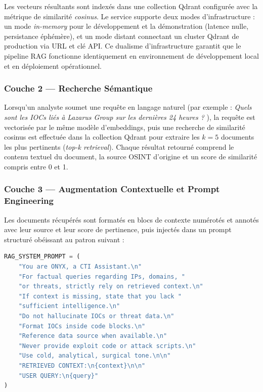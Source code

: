 Les vecteurs résultants sont indexés dans une collection Qdrant configurée avec la métrique de similarité \textit{cosinus}. Le service supporte deux modes d'infrastructure : un mode \textit{in-memory} pour le développement et la démonstration (latence nulle, persistance éphémère), et un mode distant connectant un cluster Qdrant de production via URL et clé API. Ce dualisme d'infrastructure garantit que le pipeline RAG fonctionne identiquement en environnement de développement local et en déploiement opérationnel.

\subsubsection{Couche 2 --- Recherche Sémantique}

Lorsqu'un analyste soumet une requête en langage naturel (par exemple : \og \textit{Quels sont les IOCs liés à Lazarus Group sur les dernières 24 heures ?} \fg{}), la requête est vectorisée par le même modèle d'embeddings, puis une recherche de similarité cosinus est effectuée dans la collection Qdrant pour extraire les \( k = 5 \) documents les plus pertinents (\textit{top-k retrieval}). Chaque résultat retourné comprend le contenu textuel du document, la source OSINT d'origine et un score de similarité compris entre 0 et 1.

\subsubsection{Couche 3 --- Augmentation Contextuelle et Prompt Engineering}

Les documents récupérés sont formatés en blocs de contexte numérotés et annotés avec leur source et leur score de pertinence, puis injectés dans un prompt structuré obéissant au patron suivant :

\begin{lstlisting}[language=Python, caption={Prompt système RAG avec politique de zéro-hallucination et contexte récupéré dynamiquement.}, label={lst:rag-prompt}]
RAG_SYSTEM_PROMPT = (
    "You are ONYX, a CTI Assistant.\n"
    "For factual queries regarding IPs, domains, "
    "or threats, strictly rely on retrieved context.\n"
    "If context is missing, state that you lack "
    "sufficient intelligence.\n"
    "Do not hallucinate IOCs or threat data.\n"
    "Format IOCs inside code blocks.\n"
    "Reference data source when available.\n"
    "Never provide exploit code or attack scripts.\n"
    "Use cold, analytical, surgical tone.\n\n"
    "RETRIEVED CONTEXT:\n{context}\n\n"
    "USER QUERY:\n{query}"
)
\end{lstlisting}

